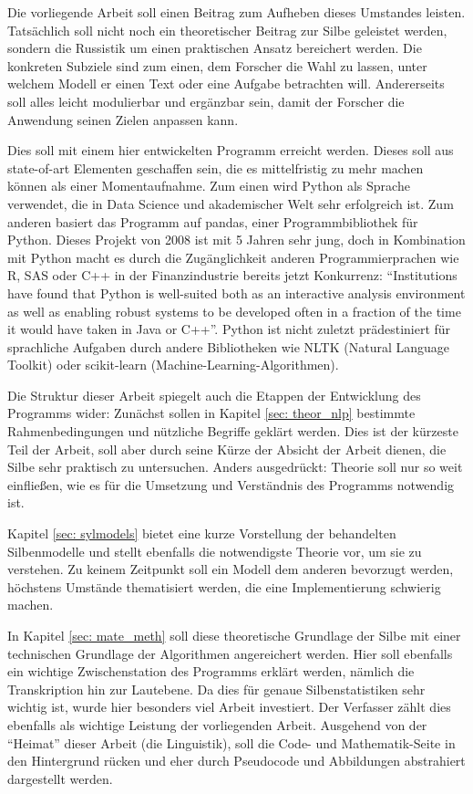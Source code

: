 \documentclass[12pt,headsepline,a4paper]{scrartcl}
\begin{document}
Die vorliegende Arbeit soll einen Beitrag zum Aufheben dieses Umstandes leisten. Tatsächlich soll nicht noch ein theoretischer Beitrag zur Silbe geleistet werden, sondern die Russistik um einen praktischen Ansatz bereichert werden. Die konkreten Subziele sind zum einen, dem Forscher die Wahl zu lassen, unter welchem Modell er einen Text oder eine Aufgabe betrachten will. Andererseits soll alles leicht modulierbar und ergänzbar sein, damit der Forscher die Anwendung seinen Zielen anpassen kann.

Dies soll mit einem hier entwickelten Programm erreicht werden. Dieses soll aus state-of-art Elementen geschaffen sein, die es mittelfristig zu mehr machen können als einer Momentaufnahme. Zum einen wird Python als Sprache verwendet, die in Data Science und akademischer Welt sehr erfolgreich ist. Zum anderen basiert das Programm auf pandas, einer Programmbibliothek für Python. Dieses Projekt von 2008 ist mit 5 Jahren sehr jung, doch in Kombination mit Python macht es durch die Zugänglichkeit anderen Programmierprachen wie R, SAS oder C++ in der Finanzindustrie bereits jetzt Konkurrenz: "`Institutions have found that Python is well-suited both
as an interactive analysis environment as well as enabling robust systems to be developed
often in a fraction of the time it would have taken in Java or C++"'\autocite[329]{mckinney2012}. Python ist nicht zuletzt prädestiniert für sprachliche Aufgaben durch andere Bibliotheken wie NLTK (Natural Language Toolkit) oder scikit-learn (Machine-Learning-Algorithmen).

Die Struktur dieser Arbeit spiegelt auch die Etappen der Entwicklung des Programms wider: Zunächst sollen in Kapitel \ref{sec: theor_nlp} bestimmte Rahmenbedingungen und nützliche Begriffe geklärt werden. Dies ist der kürzeste Teil der Arbeit, soll aber durch seine Kürze der Absicht der Arbeit dienen, die Silbe sehr praktisch zu untersuchen. Anders ausgedrückt: Theorie soll nur so weit einfließen, wie es für die Umsetzung und Verständnis des Programms notwendig ist. 

Kapitel \ref{sec: sylmodels} bietet eine kurze Vorstellung der behandelten Silbenmodelle und stellt ebenfalls die notwendigste Theorie vor, um sie zu verstehen. Zu keinem Zeitpunkt soll ein Modell dem anderen bevorzugt werden, höchstens Umstände thematisiert werden, die eine Implementierung schwierig machen.

In Kapitel \ref{sec: mate_meth} soll diese theoretische Grundlage der Silbe mit einer technischen Grundlage der Algorithmen angereichert werden. Hier soll ebenfalls ein wichtige Zwischenstation des Programms erklärt werden, nämlich die Transkription hin  zur Lautebene. Da dies für genaue Silbenstatistiken sehr wichtig ist, wurde hier besonders viel Arbeit investiert. Der Verfasser zählt dies ebenfalls als wichtige Leistung der vorliegenden Arbeit. Ausgehend von der "`Heimat"' dieser Arbeit (die Linguistik), soll die Code- und Mathematik-Seite in den Hintergrund rücken und eher durch Pseudocode und Abbildungen abstrahiert dargestellt werden.
\end{document}
